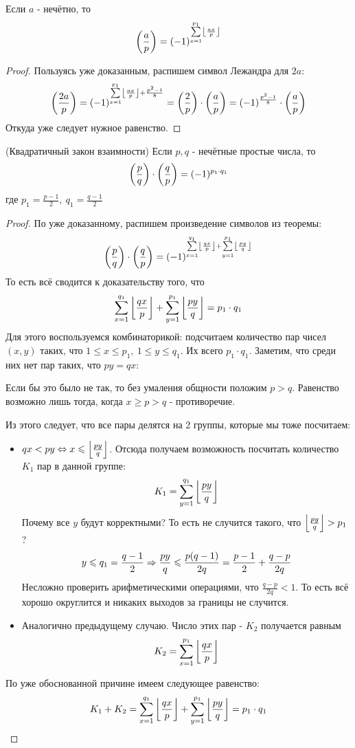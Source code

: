 \begin{corollary}
	Если $a$ - нечётно, то
	\[
		\left(\frac{ a }{ p }\right) = (-1)^{\sum\limits_{x = 1}^{p_1} \left\lfloor \frac{ax}{p} \right\rfloor}
	\]
\end{corollary}

\begin{proof}
	Пользуясь уже доказанным, распишем символ Лежандра для $2a$:
	\[
		\left(\frac{ 2a }{ p }\right) = (-1)^{\sum\limits_{x = 1}^{p_1} \left\lfloor \frac{ax}{p} \right\rfloor + \frac{p^2 - 1}{8}} = \left(\frac{ 2 }{ p }\right) \cdot \left(\frac{ a }{ p }\right) = (-1)^{\frac{p^2 - 1}{8}} \cdot \left(\frac{ a }{ p }\right)
	\]
	Откуда уже следует нужное равенство.
\end{proof}

\begin{theorem} (Квадратичный закон взаимности)
	Если $p, q$ - нечётные простые числа, то
	\[
		\left(\frac{ p }{ q }\right) \cdot \left(\frac{ q }{ p }\right) = (-1)^{p_1 \cdot q_1}
	\]
	где $p_1 = \frac{p - 1}{2},\ q_1 = \frac{q - 1}{2}$
\end{theorem}

\begin{proof}
	По уже доказанному, распишем произведение символов из теоремы:
	\[
		\left(\frac{ p }{ q }\right) \cdot \left(\frac{ q }{ p }\right) = (-1)^{\sum\limits_{x = 1}^{q_1} \left\lfloor \frac{qx}{p} \right\rfloor + \sum\limits_{y = 1}^{p_1} \left\lfloor \frac{py}{q} \right\rfloor}
	\]
	То есть всё сводится к доказательству того, что
	\[
		\sum\limits_{x = 1}^{q_1} \left\lfloor \frac{qx}{p} \right\rfloor + \sum\limits_{y = 1}^{p_1} \left\lfloor \frac{py}{q} \right\rfloor = p_1 \cdot q_1
	\]
	Для этого воспользуемся комбинаторикой: подсчитаем количество пар чисел $(x, y)$ таких, что $1 \le x \le p_1,\ 1 \le y \le q_1$. Их всего $p_1 \cdot q_1$. Заметим, что среди них нет пар таких, что $py = qx$:
	
	Если бы это было не так, то без умаления общности положим $p > q$. Равенство возможно лишь тогда, когда $x \ge p > q$ - противоречие.
	
	Из этого следует, что все пары делятся на 2 группы, которые мы тоже посчитаем:
	\begin{itemize}
		\item $qx < py \Leftrightarrow x \leqslant \left\lfloor \frac{py}{q} \right\rfloor$. Отсюда получаем возможность посчитать количество $K_1$ пар в данной группе:
		\[
			K_1 = \sum\limits_{y = 1}^{q_1} \left\lfloor \frac{py}{q} \right\rfloor
		\]
		Почему все $y$ будут корректными? То есть не случится такого, что $\left\lfloor \frac{py}{q} \right\rfloor > p_1$?
		\[
			y \leqslant q_1 = \frac{q - 1}{2} \Rightarrow \frac{py}{q} \leqslant \frac{p(q - 1)}{2q} = \frac{p - 1}{2} + \frac{q - p}{2q}
		\]
		Несложно проверить арифметическими операциями, что $\frac{q - p}{2q} < 1$. То есть всё хорошо округлится и никаких выходов за границы не случится.
		
		\item Аналогично предыдущему случаю. Число этих пар - $K_2$ получается равным
		\[
			K_2 = \sum\limits_{x = 1}^{p_1} \left\lfloor \frac{qx}{p} \right\rfloor
		\]
	\end{itemize}
	По уже обоснованной причине имеем следующее равенство:
	\[
		K_1 + K_2 = \sum\limits_{x = 1}^{q_1} \left\lfloor \frac{qx}{p} \right\rfloor + \sum\limits_{y = 1}^{p_1} \left\lfloor \frac{py}{q} \right\rfloor = p_1 \cdot q_1
	\]
\end{proof}